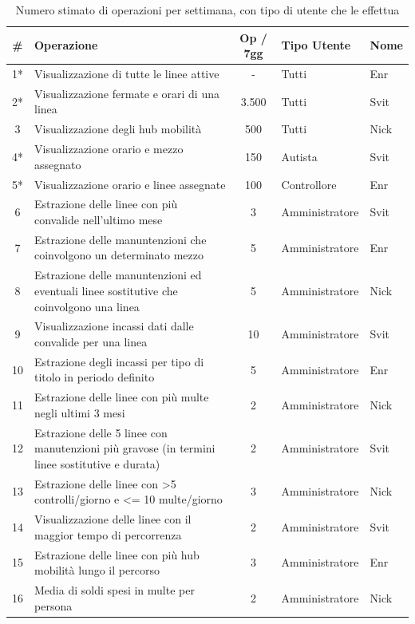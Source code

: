 \documentclass[12pt,a4paper]{report}
\begin{document}
\begin{longtable}{|c|p{7.5cm}|c|l|l|}
\caption{Numero stimato di operazioni per settimana, con tipo di utente che le effettua}
\label{table:operazioni}\\
\hline
\textbf{\#} & \textbf{Operazione} & \textbf{Op / 7gg} & \textbf{Tipo Utente} & Nome \\
\hline
\endhead
1*  & Visualizzazione di tutte le linee attive & - & Tutti & Enr \\
\hline
2* & Visualizzazione fermate e orari di una linea & 3.500 & Tutti & Svit \\
\hline
3 & Visualizzazione degli hub mobilità & 500 & Tutti & Nick \\
\hline
4* & Visualizzazione orario e mezzo assegnato & 150 & Autista & Svit  \\
\hline
5* & Visualizzazione orario e linee assegnate & 100 & Controllore & Enr \\
\hline
6 & Estrazione delle linee con più convalide nell'ultimo mese & 3 & Amministratore & Svit  \\
\hline
7 & Estrazione delle manuntenzioni che coinvolgono un determinato mezzo & 5 & Amministratore & Enr \\
\hline
8 & Estrazione delle manuntenzioni ed eventuali linee sostitutive che coinvolgono una linea & 5 & Amministratore & Nick \\
\hline
9 & Visualizzazione incassi dati dalle convalide per una linea & 10 & Amministratore & Svit  \\
\hline
10 & Estrazione degli incassi per tipo di titolo in periodo definito & 5 & Amministratore & Enr     \\
\hline
11 & Estrazione delle linee con più multe negli ultimi 3 mesi & 2 & Amministratore  & Nick  \\
\hline
12 & Estrazione delle 5 linee con manutenzioni più gravose (in termini linee sostitutive e durata) & 2 & Amministratore  & Svit     \\
\hline
13 & Estrazione delle linee con \textgreater 5 controlli/giorno e \textless = 10 multe/giorno & 3 & Amministratore   & Nick   \\
\hline
14 & Visualizzazione delle linee con il maggior tempo di percorrenza & 2 & Amministratore & Svit  \\
\hline
15 & Estrazione delle linee con più hub mobilità lungo il percorso & 3 & Amministratore & Enr \\
\hline
16 & Media di soldi spesi in multe per persona & 2 & Amministratore & Nick \\

\end{longtable}
\end{document}
